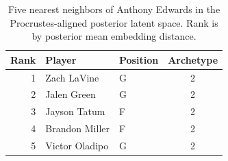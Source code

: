 \begin{table}[htbp]
  \centering\small
  \begin{tabular}{rllc}
    \toprule
    Rank & Player & Position & Archetype \\
    \midrule
    1 & Zach LaVine & G & 2 \\
    2 & Jalen Green & G & 2 \\
    3 & Jayson Tatum & F & 2 \\
    4 & Brandon Miller & F & 2 \\
    5 & Victor Oladipo & G & 2 \\
    \bottomrule
  \end{tabular}
  \caption{Five nearest neighbors of Anthony Edwards in the Procrustes-aligned posterior latent space. Rank is by posterior mean embedding distance.}
  \label{tab:Anthony_Edwards_neighbors}
\end{table}

